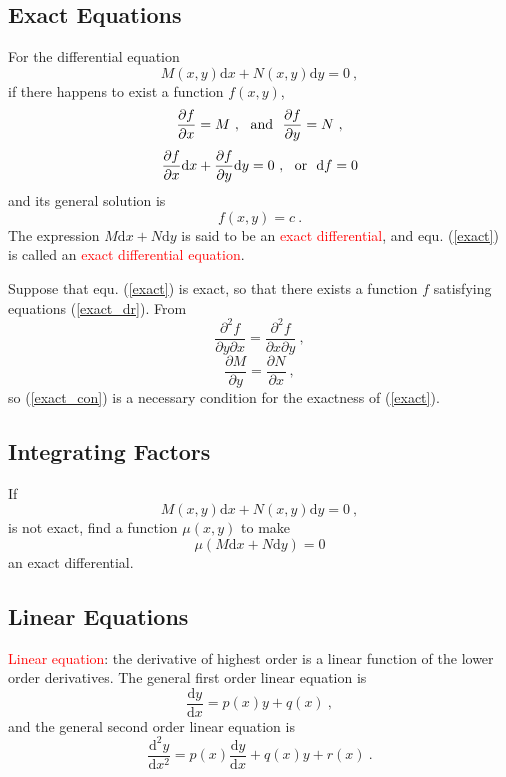\documentclass[11pt,a4paper]{article}
\newcommand{\dif}{\mathrm{d}}
\begin{document}
\subsection{Exact Equations}
For the differential equation
\begin{equation}
M(x, y) \dif x +N(x, y)\dif y =0 ~,
\label{exact}
\end{equation}
if there happens to exist a function $f(x,y)$,
\begin{eqnarray}
\frac{\partial f}{\partial x} = M ~, ~~{\rm and } ~~ \frac{\partial f}{\partial y} = N ~,
\label{exact_dr}
\end{eqnarray}
\begin{equation*}
\frac{\partial f}{\partial x} \dif x +\frac{\partial f}{\partial y} \dif y = 0 ~, ~~{\rm or } ~~ \dif f = 0
\end{equation*}
and its general solution is
\begin{equation*}
f(x, y) = c ~.
\end{equation*}
The expression $M\dif x + N\dif y$ is said to be an \textcolor{red}{exact differential}, and equ. (\ref{exact}) is called an \textcolor{red}{exact differential equation}.

Suppose that equ. (\ref{exact}) is exact, so that there exists a function $f$ satisfying equations (\ref{exact_dr}). From
\begin{equation*}
\frac{\partial^2 f}{\partial y \partial x} = \frac{\partial^2 f}{\partial x \partial y} ~,
\end{equation*}
\begin{equation}
\frac{\partial M}{\partial y} = \frac{\partial N}{\partial x} ~,
\label{exact_con}
\end{equation}
so (\ref{exact_con}) is a necessary condition for the exactness of (\ref{exact}).


\subsection{Integrating Factors}
If
\begin{equation}
M(x, y) \dif x +N(x, y)\dif y =0 ~,
\end{equation}
is not exact, find a function $\mu(x,y)$ to make
\begin{equation*}
\mu(M\dif x + N\dif y) = 0
\end{equation*}
an exact differential.


\subsection{Linear Equations}
\textcolor{red}{Linear equation}: the derivative of highest order is a linear function of the lower order derivatives. The general first order linear equation is
\begin{equation*}
\frac{\dif y}{\dif x} = p(x) y +q(x) ~,
\end{equation*}
and the general second order linear equation is
\begin{equation*}
\frac{\dif^2 y}{\dif x^2} = p(x) \frac{\dif y}{\dif x} +q(x) y +r(x)  ~.
\end{equation*}
\end{document}
